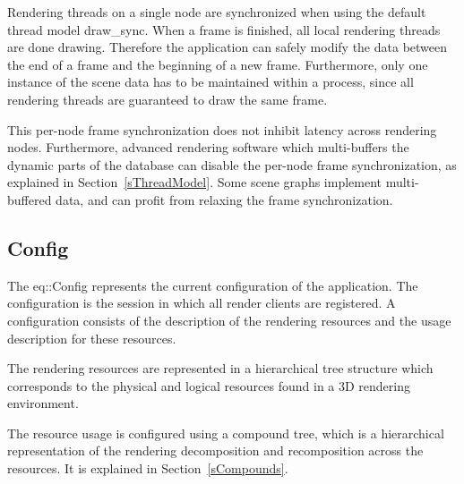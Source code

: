 \documentclass[10pt,a4]{scrartcl}
\newcommand{\sref}[1]{Section~\ref{#1}}
\begin{document}
Rendering threads on a single node are synchronized when using the
default thread model \textsf{draw\_sync}. When a frame is finished, all
local rendering threads are done drawing. Therefore the application can
safely modify the data between the end of a frame and the beginning of a
new frame. Furthermore, only one instance of the scene data has to be
maintained within a process, since all rendering threads are guaranteed
to draw the same frame.

This per-node frame synchronization does not inhibit latency across
rendering nodes. Furthermore, advanced rendering software which
multi-buffers the dynamic parts of the database can disable the per-node
frame synchronization, as explained in \sref{sThreadModel}. Some scene
graphs implement multi-buffered data, and can profit from relaxing the
frame synchronization.



\subsection{\label{sConfig}Config}

The \textsf{eq::Config} represents the current configuration of the
application. The configuration is the session in which all render
clients are registered. A configuration consists of the description of
the rendering resources and the usage description for these resources.

The rendering resources are represented in a hierarchical tree structure
which corresponds to the physical and logical resources found in a 3D
rendering environment. 

The resource usage is configured using a compound tree, which is a
hierarchical representation of the rendering decomposition and
recomposition across the resources. It is explained in \sref{sCompounds}.
\end{document}
